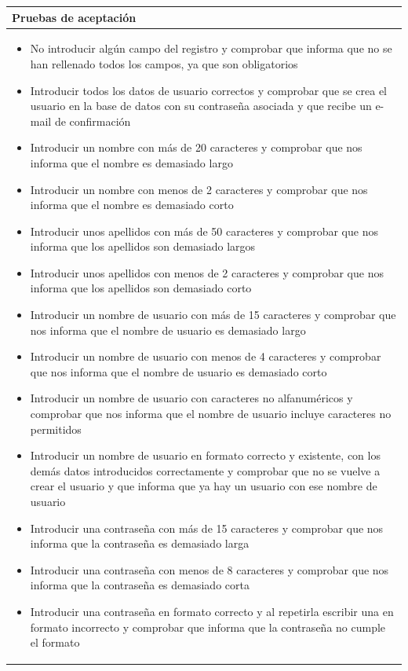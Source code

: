 \documentclass[11pt]{article}
\begin{document}
\begin{table}[H]
  \begin{tabular}{p{1.028\linewidth}}
    \textbf{Pruebas de aceptación}\\
  \midrule
  \begin{itemize}
  \item No introducir algún campo del registro y comprobar que informa que no se han rellenado todos los campos, ya que son obligatorios
  \item Introducir todos los datos de usuario correctos y comprobar que se crea el usuario en la base de datos con su contraseña asociada y que recibe un e-mail de confirmación
  \item Introducir un nombre con más de 20 caracteres y comprobar que nos informa que el nombre es demasiado largo
  \item Introducir un nombre con menos de 2 caracteres y comprobar que nos informa que el nombre es demasiado corto
  \item Introducir unos apellidos con más de 50 caracteres y comprobar que nos informa que los apellidos son demasiado largos
  \item Introducir unos apellidos con menos de 2 caracteres y comprobar que nos informa que los apellidos son demasiado corto
  \item Introducir un nombre de usuario con más de 15 caracteres y comprobar que nos informa que el nombre de usuario es demasiado largo
  \item Introducir un nombre de usuario con menos de 4 caracteres y comprobar que nos informa que el nombre de usuario es demasiado corto
  \item Introducir un nombre de usuario con caracteres no alfanuméricos y comprobar que nos informa que el nombre de usuario incluye caracteres no permitidos
  \item Introducir un nombre de usuario en formato correcto y existente, con los demás datos introducidos correctamente y comprobar que no se vuelve a crear el usuario y que informa que ya hay un usuario con ese nombre de usuario
  \item Introducir una contraseña con más de 15 caracteres y comprobar que nos informa que la contraseña es demasiado larga
  \item Introducir una contraseña con menos de  8 caracteres y comprobar que nos informa que la contraseña es demasiado corta
  \item Introducir una contraseña en formato correcto y al repetirla escribir una en formato incorrecto y comprobar que informa que la contraseña no cumple el formato

\end{itemize}
\end{tabular}
\end{table}
\end{document}
